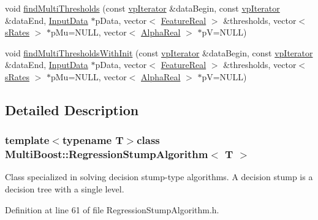 \begin{DoxyCompactItemize}
\item 
void \hyperlink{classMultiBoost_1_1RegressionStumpAlgorithm_affe1672e9c56a0d6ebed2715af8786f1}{find\-Multi\-Thresholds} (const \hyperlink{classMultiBoost_1_1RegressionStumpAlgorithm_a2b15b3238653298e01264e1d90f2ec0f}{vp\-Iterator} \&data\-Begin, const \hyperlink{classMultiBoost_1_1RegressionStumpAlgorithm_a2b15b3238653298e01264e1d90f2ec0f}{vp\-Iterator} \&data\-End, \hyperlink{classMultiBoost_1_1InputData}{Input\-Data} $\ast$p\-Data, vector$<$ \hyperlink{Defaults_8h_a3a11cfe6a5d469d921716ca6291e934f}{Feature\-Real} $>$ \&thresholds, vector$<$ \hyperlink{structMultiBoost_1_1sRates}{s\-Rates} $>$ $\ast$p\-Mu=N\-U\-L\-L, vector$<$ \hyperlink{Defaults_8h_a80184c4fd10ab70a1a17c5f97dcd1563}{Alpha\-Real} $>$ $\ast$p\-V=N\-U\-L\-L)
\item 
void \hyperlink{classMultiBoost_1_1RegressionStumpAlgorithm_adeade090a4d287c77152127e5cf5bf47}{find\-Multi\-Thresholds\-With\-Init} (const \hyperlink{classMultiBoost_1_1RegressionStumpAlgorithm_a2b15b3238653298e01264e1d90f2ec0f}{vp\-Iterator} \&data\-Begin, const \hyperlink{classMultiBoost_1_1RegressionStumpAlgorithm_a2b15b3238653298e01264e1d90f2ec0f}{vp\-Iterator} \&data\-End, \hyperlink{classMultiBoost_1_1InputData}{Input\-Data} $\ast$p\-Data, vector$<$ \hyperlink{Defaults_8h_a3a11cfe6a5d469d921716ca6291e934f}{Feature\-Real} $>$ \&thresholds, vector$<$ \hyperlink{structMultiBoost_1_1sRates}{s\-Rates} $>$ $\ast$p\-Mu=N\-U\-L\-L, vector$<$ \hyperlink{Defaults_8h_a80184c4fd10ab70a1a17c5f97dcd1563}{Alpha\-Real} $>$ $\ast$p\-V=N\-U\-L\-L)
\end{DoxyCompactItemize}


\subsection{Detailed Description}
\subsubsection*{template$<$typename T$>$class Multi\-Boost\-::\-Regression\-Stump\-Algorithm$<$ T $>$}

Class specialized in solving decision stump-\/type algorithms. A decision stump is a decision tree with a single level. 

Definition at line 61 of file Regression\-Stump\-Algorithm.\-h.



